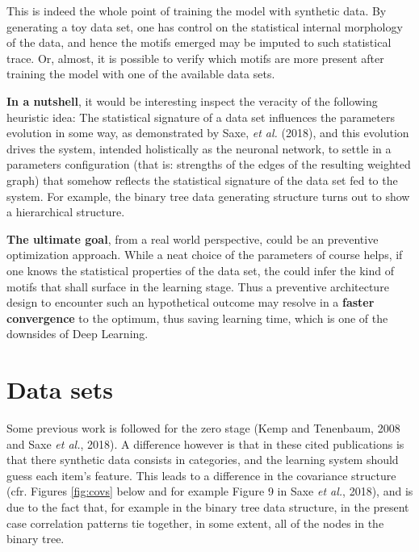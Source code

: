 \documentclass[a4paper,12pt]{article}
\begin{document}
This is indeed the whole point of training the model with synthetic data. By generating a toy data set, one has control on the statistical internal morphology of the data, and hence the motifs emerged may be imputed to such statistical trace. Or, almost, it is possible to verify which motifs are more present after training the model with one of the available data sets. %

\textbf{In a nutshell}, it would be interesting inspect the veracity of the following heuristic idea: The statistical signature of a data set influences the parameters evolution in some way, as demonstrated by Saxe, \textit{et al.} (2018), and this evolution drives the system, intended holistically as the neuronal network, to settle in a parameters configuration (that is: strengths of the edges of the resulting weighted graph) that somehow reflects the statistical signature of the data set fed to the system. For example, the binary tree data generating structure turns out to show a hierarchical structure. %

\textbf{The ultimate goal}, from a real world perspective, could be an preventive optimization approach. While a neat choice of the parameters of course helps, if one knows the statistical properties of the data set, the could infer the kind of motifs that shall surface in the learning stage. Thus a preventive architecture design to encounter such an hypothetical outcome may resolve in a \textbf{faster convergence} to the optimum, thus saving learning time, which is one of the downsides of Deep Learning.

\section{Data sets}
\label{secc:dataset}

Some previous work is followed for the zero stage (Kemp and Tenenbaum, 2008 and Saxe \textit{et al.}, 2018). A difference however is that in these cited publications is that there synthetic data consists in categories, and the learning system should guess each item's feature. This leads to a difference in the covariance structure (cfr. Figures \ref{fig:covs} below and for example Figure 9 in Saxe \textit{et al.}, 2018), and is due to the fact that, for example in the binary tree data structure, in the present case correlation patterns tie together, in some extent, all of the nodes in the binary tree.
\end{document}

